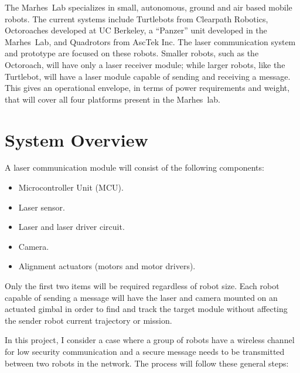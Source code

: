 \documentclass[botnum, fleqn]{unmeethesis}
\def \marhes{{\sc Marhes~}}
\begin{document}
The  \marhes Lab specializes in small, autonomous, ground and air based mobile robots. The current systems include Turtlebots from Clearpath Robotics, Octoroaches developed at UC Berkeley, a “Panzer” unit developed in the \marhes Lab, and Quadrotors from AscTek Inc. The laser communication system and prototype are focused on these robots. Smaller robots, such as the Octoroach, will have only a laser receiver module; while larger robots, like the Turtlebot, will have a laser module capable of sending and receiving a message. This gives an operational envelope, in terms of power requirements and weight, that will cover all four platforms present in the \marhes lab.

\clearpage

\section*{System Overview}

A laser communication module will consist of the following components:

\begin{itemize}
 \item Microcontroller Unit (MCU).
 \item Laser sensor.
 \item Laser and laser driver circuit.
 \item Camera.
 \item Alignment actuators (motors and motor drivers).
\end{itemize}

Only the first two items will be required regardless of robot size. Each robot capable of sending a message will have the laser and camera mounted on an actuated gimbal in order to find and track the target module without affecting the sender robot current trajectory or mission.

In this project, I consider a case where a group of robots have a wireless channel for low security communication and a secure message needs to be transmitted between two robots in the network. The process will follow these general steps:
\end{document}
